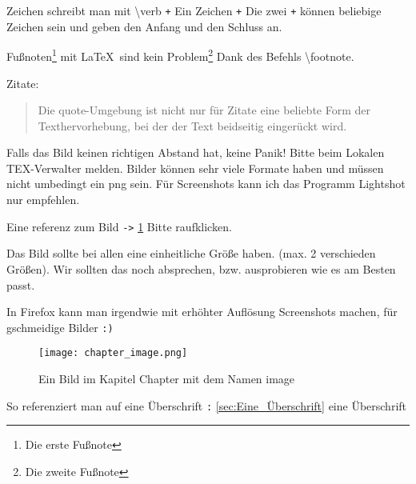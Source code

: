Zeichen schreibt man mit \textbackslash verb \verb-+- Ein Zeichen \verb-+- Die zwei \verb-+- können
beliebige Zeichen sein und geben den Anfang und den Schluss an.

Fußnoten\footnote{Die erste Fußnote} mit \LaTeX\ sind kein Problem\footnote{Die zweite Fußnote} Dank des Befehls \textbackslash footnote.

Zitate:

\begin{quote}
    Die quote-Umgebung ist nicht nur für Zitate eine beliebte Form
    der Texthervorhebung, bei der der Text beidseitig eingerückt wird.
\end{quote}


Falls das Bild keinen richtigen Abstand hat, keine Panik! Bitte beim Lokalen TEX-Verwalter melden.
Bilder können sehr viele Formate haben und müssen nicht umbedingt ein png sein.
Für Screenshots kann ich das Programm Lightshot nur empfehlen.

Eine referenz zum Bild \verb+->+ \ref{chapter:image} Bitte raufklicken.

Das Bild sollte bei allen eine einheitliche Größe haben. (max. 2 verschieden Größen). Wir sollten das noch absprechen,
bzw. ausprobieren wie es am Besten passt.

In Firefox kann man irgendwie mit erhöhter Auflösung Screenshots machen, für gschmeidige Bilder \verb-:)-

\begin{figure}[h]
    \centering
    \texttt{[image: chapter\_image.png]}
    \caption{Ein Bild im Kapitel Chapter mit dem Namen image}
    \label{chapter:image}
\end{figure}

So referenziert man auf eine Überschrift \verb-:- \autoref{sec:Eine_Überschrift} eine Überschrift